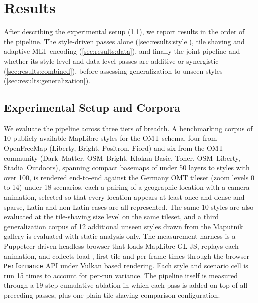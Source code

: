 
\section{Results}\label{sec:results}
After describing the experimental setup (\cref{sec:results:setup}), we report results in the order of the pipeline.
The style-driven passes alone (\cref{sec:results:style}), tile shaving and adaptive \ac{MLT} encoding (\cref{sec:results:data}), and finally the joint pipeline and whether its style-level and data-level passes are additive or synergistic (\cref{sec:results:combined}), before assessing generalization to unseen styles (\cref{sec:results:generalization}).

\subsection{Experimental Setup and Corpora}\label{sec:results:setup}
We evaluate the pipeline across three tiers of breadth.
A benchmarking corpus of \num{10} publicly available MapLibre styles for the \ac{OMT} schema, four from OpenFreeMap (Liberty, Bright, Positron, Fiord) and six from the \ac{OMT} community (Dark~Matter, OSM~Bright, Klokan-Basic, Toner, OSM~Liberty, Stadia~Outdoors), spanning compact basemaps of under \num{50} layers to styles with over \num{100}, is rendered end-to-end against the Germany \ac{OMT} tileset (zoom levels 0 to 14) under \num{18} scenarios, each a pairing of a geographic location with a camera animation, selected so that every location appears at least once and dense and sparse, Latin and non-Latin cases are all represented.
The same \num{10} styles are also evaluated at the tile-shaving size level on the same tileset, and a third generalization corpus of \num{12} additional unseen styles drawn from the Maputnik gallery is evaluated with static analysis only.
The measurement harness is a Puppeteer-driven headless browser that loads MapLibre GL JS, replays each animation, and collects load-, first tile and per-frame-times through the browser \texttt{Performance} API under Vulkan based rendering.
Each style and scenario cell is run \num{15} times to account for per-run variance.
The pipeline itself is measured through a 19-step cumulative ablation in which each pass is added on top of all preceding passes, plus one plain-tile-shaving comparison configuration.


